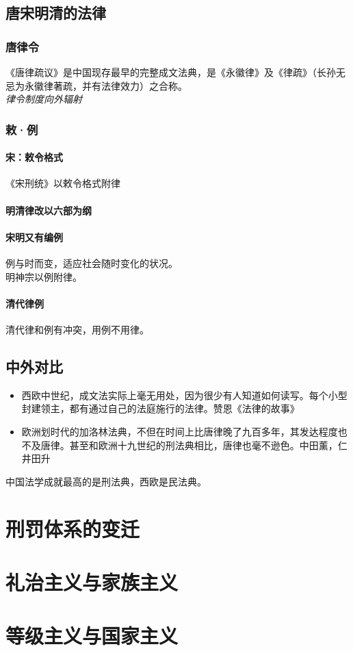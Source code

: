 \documentclass[twoside]{article}
\begin{document}
\subsection{唐宋明清的法律}
\subsubsection{唐律令}
《唐律疏议》是中国现存最早的完整成文法典，是《永徽律》及《律疏》（长孙无忌为永徽律著疏，并有法律效力）之合称。\\
\textit{律令制度向外辐射}
\subsubsection{敕·例}
\paragraph*{宋：敕令格式}
《宋刑统》以敕令格式附律
\paragraph*{明清律改以六部为纲}
\paragraph*{宋明又有编例}
例与时而变，适应社会随时变化的状况。\\
明神宗以例附律。
\paragraph*{清代律例}
清代律和例有冲突，用例不用律。
\subsection{中外对比}
\begin{itemize}
	\item 西欧中世纪，成文法实际上毫无用处，因为很少有人知道如何读写。每个小型封建领主，都有通过自己的法庭施行的法律。赞恩《法律的故事》
	\item 欧洲划时代的加洛林法典，不但在时间上比唐律晚了九百多年，其发达程度也不及唐律。甚至和欧洲十九世纪的刑法典相比，唐律也毫不逊色。中田薰，仁井田升
\end{itemize}
中国法学成就最高的是刑法典，西欧是民法典。

\section{刑罚体系的变迁}
\section{礼治主义与家族主义}
\section{等级主义与国家主义}
\end{document}

